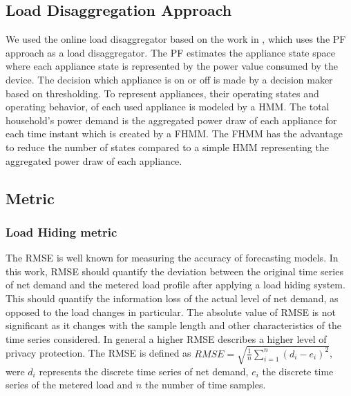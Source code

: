 \documentclass{article}
\begin{document}
\subsection{Load Disaggregation Approach}
We used the online load disaggregator based on the work in \cite{Egarter2013BuildSys}, which uses the \ac{PF} approach as a load disaggregator.
The \ac{PF} estimates the appliance state space where each appliance state is represented by the power value consumed by the device.
The decision which appliance is on or off is made by a decision maker based on thresholding.
To represent appliances, their operating states and operating behavior, of each used appliance is modeled by a \ac{HMM}.
The total household's power demand is the aggregated power draw of each appliance for each time instant which is created by a \ac{FHMM}.
The \ac{FHMM} has the advantage to reduce the number of states compared to a simple \ac{HMM} representing the aggregated power draw of each appliance.

\subsection{Metric}

\subsubsection{Load Hiding metric} 
The \ac{RMSE} is well known for measuring the accuracy of forecasting models. In this work, \ac{RMSE} should quantify the deviation between the original time series of net demand and the metered load profile after applying a load hiding system. This should quantify the information loss of the actual level of net demand, as opposed to the load changes in particular. The absolute value of \ac{RMSE} is not significant as it changes with the sample length and other characteristics of the time series considered. In general a higher \ac{RMSE} describes a higher level of privacy protection. The \ac{RMSE} is defined as
$ RMSE = \sqrt{\frac{1}{n} \sum_{i=1}^n (d_i - e_i)^2} $,
were $d_i$ represents the discrete time series of net demand, $e_i$ the discrete time series of the metered load and $n$ the number of time samples.
\end{document}
